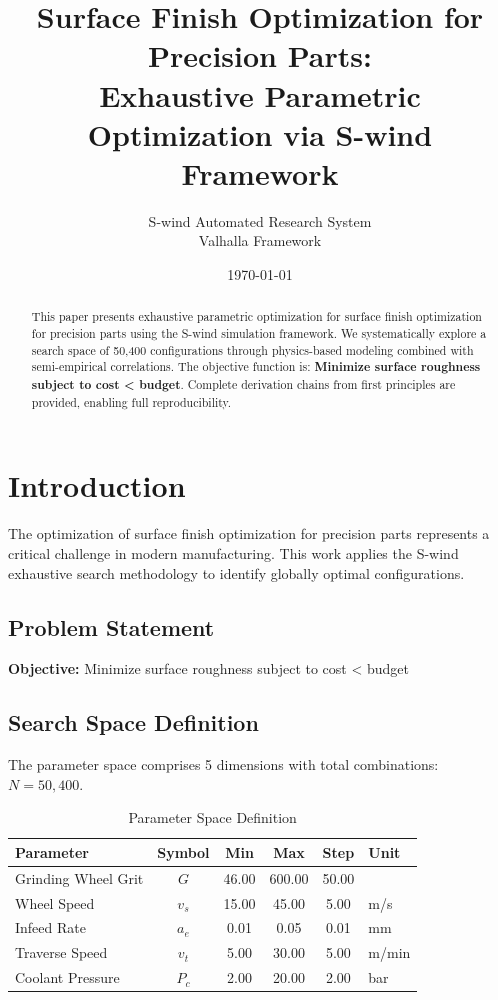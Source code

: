 \documentclass[11pt,twocolumn]{article}
\title{Surface Finish Optimization for Precision Parts: \\Exhaustive Parametric Optimization via S-wind Framework}
\author{S-wind Automated Research System\\Valhalla Framework}
\date{\today}
\begin{document}
\maketitle

\begin{abstract}
This paper presents exhaustive parametric optimization for surface finish optimization for precision parts using the S-wind simulation framework.
We systematically explore a search space of 50,400 configurations through physics-based modeling
combined with semi-empirical correlations. The objective function is: \textbf{Minimize surface roughness subject to cost < budget}.
Complete derivation chains from first principles are provided, enabling full reproducibility.
\end{abstract}

\section{Introduction}
The optimization of surface finish optimization for precision parts represents a critical challenge in modern manufacturing.
This work applies the S-wind exhaustive search methodology to identify globally optimal configurations.

\subsection{Problem Statement}
\textbf{Objective:} Minimize surface roughness subject to cost < budget

\subsection{Search Space Definition}
The parameter space comprises 5 dimensions with total combinations: $N = 50,400$.

\begin{table}[h]
\centering
\caption{Parameter Space Definition}
\begin{tabular}{@{}lccccl@{}}
\toprule
Parameter & Symbol & Min & Max & Step & Unit \\
\midrule
Grinding Wheel Grit & $G$ & 46.00 & 600.00 & 50.00 &  \\
Wheel Speed & $v_s$ & 15.00 & 45.00 & 5.00 & m/s \\
Infeed Rate & $a_e$ & 0.01 & 0.05 & 0.01 & mm \\
Traverse Speed & $v_t$ & 5.00 & 30.00 & 5.00 & m/min \\
Coolant Pressure & $P_c$ & 2.00 & 20.00 & 2.00 & bar \\
\bottomrule
\end{tabular}
\end{table}
\end{document}
